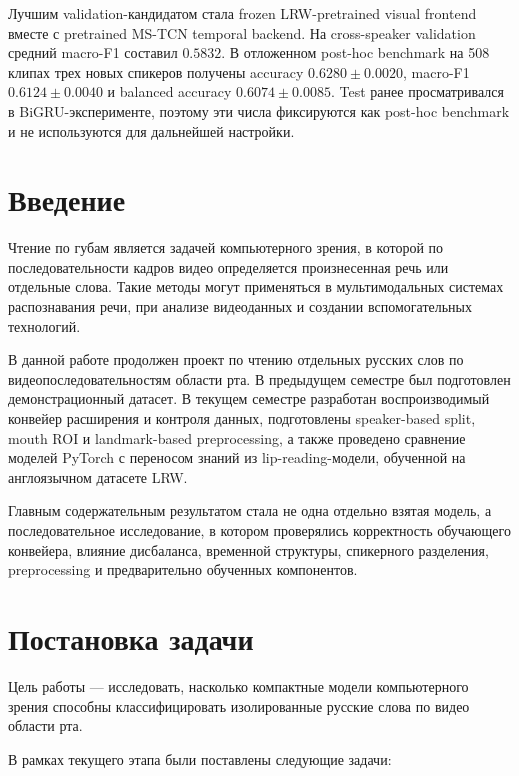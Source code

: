 \documentclass[12pt,a4paper]{article}
\begin{document}
Лучшим validation-кандидатом стала frozen LRW-pretrained visual frontend
вместе с pretrained MS-TCN temporal backend. На cross-speaker validation
средний macro-F1 составил $0.5832$. В отложенном post-hoc benchmark на
508 клипах трех новых спикеров получены accuracy
$0.6280 \pm 0.0020$, macro-F1 $0.6124 \pm 0.0040$ и balanced accuracy
$0.6074 \pm 0.0085$. Test ранее просматривался в BiGRU-эксперименте,
поэтому эти числа фиксируются как post-hoc benchmark и не используются
для дальнейшей настройки.

\tableofcontents
\newpage

\section{Введение}

Чтение по губам является задачей компьютерного зрения, в которой по
последовательности кадров видео определяется произнесенная речь или отдельные
слова. Такие методы могут применяться в мультимодальных системах распознавания
речи, при анализе видеоданных и создании вспомогательных технологий.

В данной работе продолжен проект по чтению отдельных русских слов по
видеопоследовательностям области рта. В предыдущем семестре был подготовлен
демонстрационный датасет. В текущем семестре разработан воспроизводимый
конвейер расширения и контроля данных, подготовлены speaker-based split,
mouth ROI и landmark-based preprocessing, а также проведено сравнение
моделей PyTorch с переносом знаний из lip-reading-модели, обученной на
англоязычном датасете LRW.

Главным содержательным результатом стала не одна отдельно взятая модель,
а последовательное исследование, в котором проверялись корректность
обучающего конвейера, влияние дисбаланса, временной структуры, спикерного
разделения, preprocessing и предварительно обученных компонентов.

\section{Постановка задачи}

Цель работы --- исследовать, насколько компактные модели компьютерного
зрения способны классифицировать изолированные русские слова по видео
области рта.

В рамках текущего этапа были поставлены следующие задачи:
\end{document}
